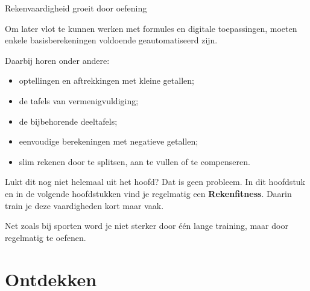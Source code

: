 \documentclass{ximera}
\begin{document}
\begin{themaintro}{Rekenvaardigheid groeit door oefening}

    Om later vlot te kunnen werken met formules en digitale toepassingen,
    moeten enkele basisberekeningen voldoende geautomatiseerd zijn.
    
    Daarbij horen onder andere:
    
    \begin{itemize}
      \item optellingen en aftrekkingen met kleine getallen;
      \item de tafels van vermenigvuldiging;
      \item de bijbehorende deeltafels;
      \item eenvoudige berekeningen met negatieve getallen;
      \item slim rekenen door te splitsen, aan te vullen of te compenseren.
    \end{itemize}
    
    Lukt dit nog niet helemaal uit het hoofd? Dat is geen probleem.
    In dit hoofdstuk en in de volgende hoofdstukken vind je regelmatig een
    \textbf{Rekenfitness}. Daarin train je deze vaardigheden kort maar vaak.
    
    Net zoals bij sporten word je niet sterker door één lange training,
    maar door regelmatig te oefenen.
    
    \end{themaintro}


\section{Ontdekken}
\end{document}
